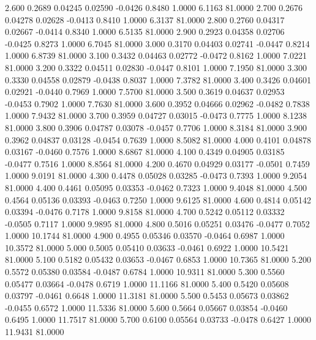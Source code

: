    2.600   0.2689   0.04245   0.02590  -0.0426   0.8480   1.0000   6.1163  81.0000
   2.700   0.2676   0.04278   0.02628  -0.0413   0.8410   1.0000   6.3137  81.0000
   2.800   0.2760   0.04317   0.02667  -0.0414   0.8340   1.0000   6.5135  81.0000
   2.900   0.2923   0.04358   0.02706  -0.0425   0.8273   1.0000   6.7045  81.0000
   3.000   0.3170   0.04403   0.02741  -0.0447   0.8214   1.0000   6.8739  81.0000
   3.100   0.3432   0.04463   0.02772  -0.0472   0.8162   1.0000   7.0221  81.0000
   3.200   0.3322   0.04511   0.02830  -0.0447   0.8101   1.0000   7.1950  81.0000
   3.300   0.3330   0.04558   0.02879  -0.0438   0.8037   1.0000   7.3782  81.0000
   3.400   0.3426   0.04601   0.02921  -0.0440   0.7969   1.0000   7.5700  81.0000
   3.500   0.3619   0.04637   0.02953  -0.0453   0.7902   1.0000   7.7630  81.0000
   3.600   0.3952   0.04666   0.02962  -0.0482   0.7838   1.0000   7.9432  81.0000
   3.700   0.3959   0.04727   0.03015  -0.0473   0.7775   1.0000   8.1238  81.0000
   3.800   0.3906   0.04787   0.03078  -0.0457   0.7706   1.0000   8.3184  81.0000
   3.900   0.3962   0.04837   0.03128  -0.0454   0.7639   1.0000   8.5082  81.0000
   4.000   0.4101   0.04878   0.03167  -0.0460   0.7576   1.0000   8.6867  81.0000
   4.100   0.4349   0.04905   0.03185  -0.0477   0.7516   1.0000   8.8564  81.0000
   4.200   0.4670   0.04929   0.03177  -0.0501   0.7459   1.0000   9.0191  81.0000
   4.300   0.4478   0.05028   0.03285  -0.0473   0.7393   1.0000   9.2054  81.0000
   4.400   0.4461   0.05095   0.03353  -0.0462   0.7323   1.0000   9.4048  81.0000
   4.500   0.4564   0.05136   0.03393  -0.0463   0.7250   1.0000   9.6125  81.0000
   4.600   0.4814   0.05142   0.03394  -0.0476   0.7178   1.0000   9.8158  81.0000
   4.700   0.5242   0.05112   0.03332  -0.0505   0.7117   1.0000   9.9895  81.0000
   4.800   0.5016   0.05251   0.03476  -0.0477   0.7052   1.0000  10.1744  81.0000
   4.900   0.4955   0.05346   0.03570  -0.0464   0.6987   1.0000  10.3572  81.0000
   5.000   0.5005   0.05410   0.03633  -0.0461   0.6922   1.0000  10.5421  81.0000
   5.100   0.5182   0.05432   0.03653  -0.0467   0.6853   1.0000  10.7365  81.0000
   5.200   0.5572   0.05380   0.03584  -0.0487   0.6784   1.0000  10.9311  81.0000
   5.300   0.5560   0.05477   0.03664  -0.0478   0.6719   1.0000  11.1166  81.0000
   5.400   0.5420   0.05608   0.03797  -0.0461   0.6648   1.0000  11.3181  81.0000
   5.500   0.5453   0.05673   0.03862  -0.0455   0.6572   1.0000  11.5336  81.0000
   5.600   0.5664   0.05667   0.03854  -0.0460   0.6495   1.0000  11.7517  81.0000
   5.700   0.6100   0.05564   0.03733  -0.0478   0.6427   1.0000  11.9431  81.0000
